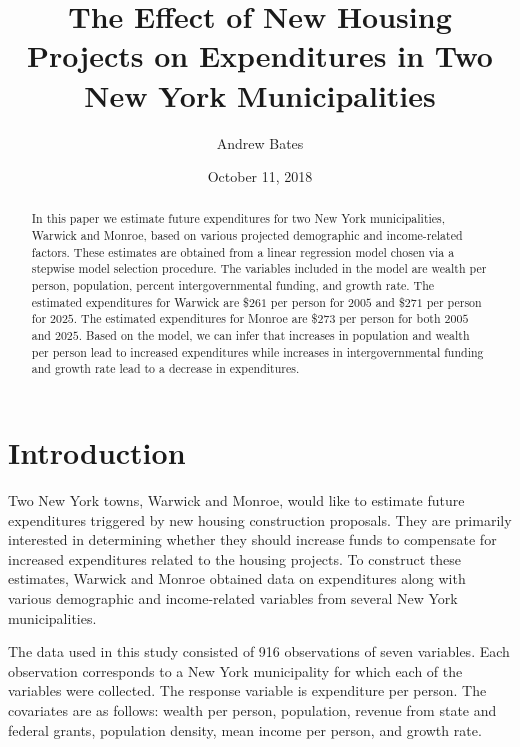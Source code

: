 \documentclass{article}\usepackage[]{graphicx}\usepackage[]{color}
\title{The Effect of New Housing Projects on Expenditures in Two New York Municipalities}
\author{Andrew Bates}
\date{October 11, 2018}
\begin{document}
 
\maketitle

\begin{abstract}
In this paper we estimate future expenditures for two New York municipalities, Warwick and Monroe, based on various projected demographic and income-related factors. These estimates are obtained from a linear regression model chosen via a stepwise model selection procedure. The variables included in the model are wealth per person, population, percent intergovernmental funding, and growth rate. The estimated expenditures for Warwick are \$$261$ per person for $2005$ and \$$271$ per person for $2025$. The estimated expenditures for Monroe are \$$273$ per person for both $2005$ and $2025$. Based on the model, we can infer that increases in population and wealth per person lead to increased expenditures while increases in intergovernmental funding and growth rate lead to a decrease in expenditures.
\end{abstract}


\section{Introduction} \label{intro}

Two New York towns, Warwick and Monroe, would like to estimate future expenditures triggered by new housing construction proposals. They are primarily interested in determining whether they should increase funds to compensate for increased expenditures related to the housing projects. To construct these estimates, Warwick and Monroe obtained data on expenditures along with various demographic and income-related variables from several New York municipalities. 


The data used in this study consisted of 916 observations of seven variables. Each observation corresponds to a New York municipality for which each of the variables were collected. The response variable is expenditure per person. The covariates are as follows: wealth per person, population, revenue from state and federal grants, population density, mean income per person, and growth rate.
\end{document}
